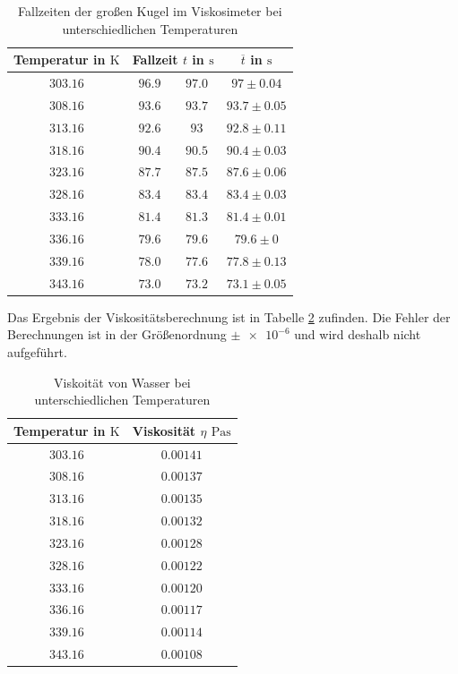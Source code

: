 \begin{table}
\centering
\begin{tabular} {cccc}
  \toprule
  Temperatur in $\si{\kelvin}$ & \multicolumn{2}{c}{Fallzeit $t$ in $\si{\second}$} & $\overline{t}$ in $\si{\second}$ \\
  \midrule 
  $\num{303.16}$ & $\num{96.9}$  & $\num{97.0}$ & $\num{97}\pm\num{0.04}$ \\
  $\num{308.16}$ & $\num{93.6}$  & $\num{93.7}$ & $\num{93.7}\pm\num{0.05}$ \\
  $\num{313.16}$ & $\num{92.6}$ & $\num{93}$   & $\num{92.8}\pm\num{0.11}$ \\
  $\num{318.16}$ & $\num{90.4}$ & $\num{90.5}$ &  $\num{90.4}\pm\num{0.03}$ \\
  $\num{323.16}$ & $\num{87.7}$ & $\num{87.5}$ & $\num{87.6}\pm\num{0.06}$ \\
  $\num{328.16}$ & $\num{83.4}$ & $\num{83.4}$ & $\num{83.4}\pm\num{0.03}$ \\
  $\num{333.16}$ & $\num{81.4}$ & $\num{81.3}$ & $\num{81.4}\pm\num{0.01}$ \\
  $\num{336.16}$ & $\num{79.6}$ & $\num{79.6}$ & $\num{79.6}\pm\num{0}$ \\
  $\num{339.16}$ & $\num{78.0}$ &  $\num{77.6}$ & $\num{77.8}\pm\num{0.13}$ \\
  $\num{343.16}$ & $\num{73.0}$ & $\num{73.2}$ & $\num{73.1}\pm\num{0.05}$ \\
\bottomrule
\end{tabular}
\caption{Fallzeiten der großen Kugel im Viskosimeter bei unterschiedlichen Temperaturen}
\label{tab:messwerte_fallzeit_kugel_gross_temo}
\end{table}

Das Ergebnis der Viskositätsberechnung ist in Tabelle \ref{tab:visko_wasser_temp} zufinden.
Die Fehler der Berechnungen ist in der Größenordnung $\pm \num{e-6}$ und 
wird deshalb nicht aufgeführt.

\begin{table}
\centering
\begin{tabular} {cc}
  \toprule
  Temperatur in $\si{\kelvin}$ & Viskosität $\eta$ $\si{\pascal\second}$ \\
  \midrule 
  $\num{303.16}$ & $\num{0.00141}$ \\
  $\num{308.16}$ & $\num{0.00137}$ \\
  $\num{313.16}$ & $\num{0.00135}$ \\ 
  $\num{318.16}$ & $\num{0.00132}$ \\
  $\num{323.16}$ & $\num{0.00128}$ \\ 
  $\num{328.16}$ & $\num{0.00122}$ \\ 
  $\num{333.16}$ & $\num{0.00120}$ \\ 
  $\num{336.16}$ & $\num{0.00117}$ \\
  $\num{339.16}$ & $\num{0.00114}$ \\
  $\num{343.16}$ & $\num{0.00108}$ \\
\bottomrule
\end{tabular}
\caption{Viskoität von Wasser bei unterschiedlichen Temperaturen}
\label{tab:visko_wasser_temp}
\end{table}

